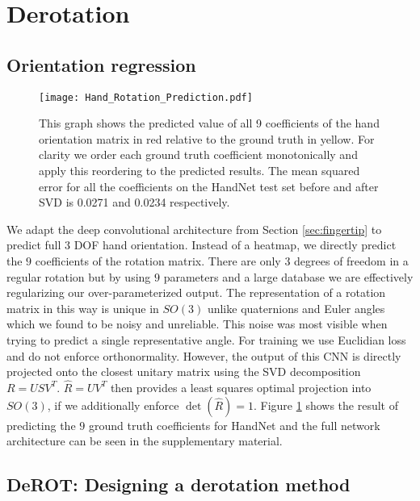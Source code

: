 \documentclass{bmvc2k}
\begin{document}
\section{Derotation}\label{sec:derotation}

\subsection{Orientation regression}\label{sec:regression}

\begin{figure}[t]
\begin{center}
\texttt{[image: Hand\_Rotation\_Prediction.pdf]}
\end{center}
   \caption{\scriptsize \color{blue} This graph shows the predicted value of all 9 coefficients of the hand orientation matrix in red relative to the ground truth in yellow. For clarity we order each ground truth coefficient monotonically and apply this reordering to the predicted results. The mean squared error for all the coefficients on the HandNet test set before and after SVD is 0.0271 and 0.0234 respectively.}
\label{fig:rotationgraph}
\end{figure}

We adapt the deep convolutional architecture from Section \ref{sec:fingertip} to predict full $3$ DOF hand orientation. Instead of a heatmap, we directly predict the $9$ coefficients of the rotation matrix. There are only $3$ degrees of freedom in a regular rotation but by using $9$ parameters and a large database we are effectively regularizing our over-parameterized output. The representation of a rotation matrix in this way is unique in $SO\left(3\right)$ unlike quaternions and Euler angles which we found to be noisy and unreliable. This noise was most visible when trying to predict a single representative angle. For training we use Euclidian loss and do not enforce orthonormality. However, the output of this CNN is directly projected onto the closest unitary matrix using the SVD decomposition $R = USV^T$. $\hat{R} = UV^T$ then provides a least squares optimal projection into $SO\left(3\right)$, if we additionally enforce $\det\left(\hat{R}\right)=1$. Figure \ref{fig:rotationgraph} shows the result of predicting the $9$ ground truth coefficients for HandNet and the full network architecture can be seen in the supplementary material. 


\subsection{DeROT: Designing a derotation method}\label{sec:derot}
\end{document}
